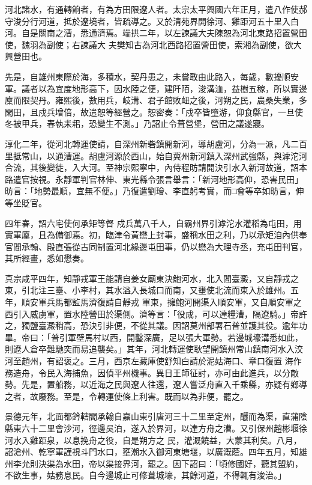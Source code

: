 \begin{pinyinscope}
 河北諸水，有通轉餉者，有為方田限遼人者。太宗太平興國六年正月，遣八作使郝守浚分行河道，抵於遼境者，皆疏導之。又於清苑界開徐河、雞距河五十里入白河。自是關南之漕，悉通濟焉。端拱二年，以左諫議大夫陳恕為河北東路招置營田使，魏羽為副使；右諫議大
 夫樊知古為河北西路招置營田使，索湘為副使，欲大興營田也。



 先是，自雄州東際於海，多積水，契丹患之，未嘗敢由此路入，每歲，數擾順安軍。議者以為宜度地形高下，因水陸之便，建阡陌，浚溝洫，益樹五稼，所以實邊廩而限契丹。雍熙後，數用兵，岐溝、君子館敗衄之後，河朔之民，農桑失業，多閑田，且戍兵增倍，故遣恕等經營之。恕密奏：「戍卒皆墮游，仰食縣官，一旦使冬被甲兵，春執耒耜，恐變生不測。」乃詔止令葺營堡，營田之議遂寢。



 淳化二年，從河北轉運使請，自深州新砦鎮開新河，導胡盧河，分為一派，凡二百里抵常山，以通漕運。胡盧河源於西山，始自冀州新河鎮入深州武強縣，與滹沱河合流，其後變徙，入大河。至神宗熙寧中，內侍程昉請開決引水入新河故道，詔本路遣官按視。永靜軍判官林伸、東光縣令張言舉言：「新河地形高仰，恐害民田」昉言：「地勢最順，宜無不便。」乃復遣劉璯、李直躬考實，而□會等卒如昉言，伸等坐貶官。



 四年春，詔六宅使何承矩等督
 戍兵萬八千人，自霸州界引滹沱水灌稻為屯田，用實軍廩，且為備御焉。初，臨津令黃懋上封事，盛稱水田之利，乃以承矩洎內供奉官閻承翰、殿直張從古同制置河北緣邊屯田事，仍以懋為大理寺丞，充屯田判官，其所經畫，悉如懋奏。



 真宗咸平四年，知靜戎軍王能請自姜女廟東決鮑河水，北入閻臺澱，又自靜戎之東，引北注三臺、小李村，其水溢入長城口而南，又壅使北流而東入於雄州。五年，順安軍兵馬都監馬濟復請自靜戎
 軍東，擁鮑河開渠入順安軍，又自順安軍之西引入威虜軍，置水陸營田於渠側。濟等言：「役成，可以達糧漕，隔遼騎。」帝許之，獨鹽臺澱稍高，恐決引非便，不從其議。因詔莫州部署石普並護其役。逾年功畢。帝曰：「普引軍壁馬村以西，開鑿深廣，足以張大軍勢。若邊城壕溝悉如此，則遼人倉卒難馳突而易追襲矣。」其年，河北轉運使耿望開鎮州常山鎮南河水入洨河至趙州，有詔褒之。三月，西京左藏庫使舒知白請於泥姑海口、章口復置
 海作務造舟，令民入海捕魚，因偵平州機事。異日王師征討，亦可由此進兵，以分敵勢。先是，置船務，以近海之民與遼人往還，遼人嘗泛舟直入千乘縣，亦疑有鄉導之者，故廢務。至是，令轉運使條上利害。既而以為非便，罷之。



 景德元年，北面都鈐轄閻承翰自嘉山東引唐河三十二里至定州，釃而為渠，直蒲陰縣東六十二里會沙河，徑邊吳泊，遂入於界河，以達方舟之漕。又引保州趙彬堰徐河水入雞距泉，以息挽舟之役，自是朔方之
 民，灌溉饒益，大蒙其利矣。八月，詔滄州、乾寧軍謹視斗門水口，壅潮水入御河東塘堰，以廣溉蔭。四年五月，知雄州李允則決渠為水田，帝以渠接界河，罷之。因下詔曰：「頃修國好，聽其盟約，不欲生事，姑務息民。自今邊城止可修葺城壕，其餘河道，不得輒有浚治。」




\end{pinyinscope}
